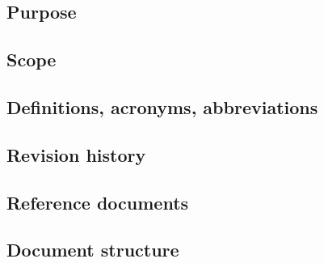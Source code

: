 \documentclass[../main.tex]{subfiles}
\begin{document}
\subsection{Purpose}
\subsection{Scope}
\subsection{Definitions, acronyms, abbreviations}
\subsection{Revision history}
\subsection{Reference documents}
\subsection{Document structure}
\end{document}
